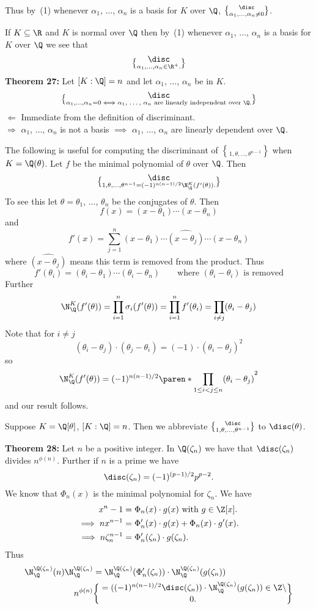 Thus by~(1) whenever $\alpha_1$, $\dotsc$, $\alpha_n$ is a basis for $K$ over $\Q$, $\disc\brace{\alpha_1,\dotsc,\alpha_n}\neq0$.

\remark If $K\subseteq\R$ and $K$ is normal over $\Q$ then by~(1) whenever $\alpha_1$, $\dotsc$, $\alpha_n$ is a basis for $K$ over $\Q$ we see that
\[ \disc\brace{\alpha_1,\dotsc,\alpha_n} \in \R^+ . \]
\textbf{Theorem 27:} Let $[K:\Q]=n$ and let $\alpha_1$, $\dotsc$, $\alpha_n$ be in $K$.
\[ \disc\brace{\alpha_1,\dotsc,\alpha_n} = 0 \iff \text{$\alpha_1$, $\dotsc$, $\alpha_n$ are linearly independent over $\Q$.} \]
\pf $\Leftarrow$ Immediate from the definition of discriminant. \\
$\Rightarrow$ $\alpha_1$, $\dotsc$, $\alpha_n$ is not a basis $\implies$ $\alpha_1$, $\dotsc$, $\alpha_n$ are linearly dependent over $\Q$.

\note The following is useful for computing the discriminant of $\brace{1,\theta,\dotsc,\theta^{n-1}}$ when $K=\Q(\theta)$.  Let $f$ be the minimal polynomial of $\theta$ over $\Q$.  Then
\[ \disc\brace{1,\theta,\dotsc,\theta^{n-1}} = (-1)^{n(n-1)/2}\N_{\Q}^K(f'(\theta)) . \]
To see this let $\theta=\theta_1$, $\dotsc$, $\theta_n$ be the conjugates of $\theta$.  Then 
\[ f(x) = (x-\theta_1)\dotsm(x-\theta_n) \]
and
\[ f'(x) = \sum_{j=1}^n(x-\theta_1)\dotsm\widehat{(x-\theta_j)}\dotsm(x-\theta_n) \]
where $\widehat{(x-\theta_j)}$ means this term is removed from the product.  Thus
\[ f'(\theta_i) = (\theta_i-\theta_1)\dotsm(\theta_i-\theta_n) \qquad\text{where $(\theta_i-\theta_i)$ is removed} \]
Further
\[ \N_\Q^K(f'(\theta)) = \prod_{i=1}^n\sigma_i(f'(\theta)) = \prod_{i=1}^n f'(\theta_i) = \prod_{i\neq j}(\theta_i-\theta_j) \]
Note that for $i\neq j$
\[ (\theta_i-\theta_j)\cdot(\theta_j-\theta_i) = (-1)\cdot(\theta_i-\theta_j)^2 \]
so
\[ \N_\Q^K(f'(\theta)) = (-1)^{n(n-1)/2}\paren*{\prod_{1\leq i<j\leq n}(\theta_i-\theta_j)}^2 \]
and our result follows.

Suppose $K=\Q[\theta]$, $[K:\Q]=n$.  Then we abbreviate $\disc\brace{1,\theta,\dotsc,\theta^{n-1}}$ to $\disc(\theta)$.

\textbf{Theorem 28:} Let $n$ be a positive integer.  In $\Q(\zeta_n)$ we have that $\disc(\zeta_n)$ divides $n^{\phi(n)}$.  Further if $n$ is a prime we have
\[ \disc(\zeta_n) = (-1)^{(p-1)/2}p^{p-2} . \]
\pf We know that $\Phi_n(x)$ is the minimal polynomial for $\zeta_n$.  We have
\begin{align*}
x^n - 1 &= \Phi_n(x) \cdot g(x) \text{ with } g\in\Z[x] . \\
\implies nx^{n-1} &= \Phi_n'(x)\cdot g(x) + \Phi_n(x)\cdot g'(x) . \\
\implies n\zeta_n^{n-1} &= \Phi_n'(\zeta_n)\cdot g(\zeta_n) .
\end{align*}
Thus
\begin{align*}
\N_\Q^{\Q(\zeta_n)}(n)\N_\Q^{\Q(\zeta_n)} &= \N_\Q^{\Q(\zeta_n)}(\Phi_n'(\zeta_n))\cdot\N_\Q^{\Q(\zeta_n)}(g(\zeta_n)) \\
n^{\phi(n)} &= ((-1)^{n(n-1)/2}\disc(\zeta_n))\cdot\N_\Q^{\Q(\zeta_n)}(g(\zeta_n)) \in \Z\setminus\brace{0} .
\end{align*}
